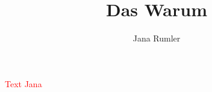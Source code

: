 \documentclass[output=paper]{langsci/langscibook}
\title{Das Warum}
\author{Jana Rumler  \affiliation{Museum für Naturkunde Berlin}}
\begin{document}
\maketitle

\noindent \textcolor{red}{Text Jana}
\end{document}
